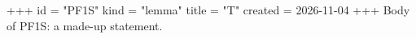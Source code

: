 +++
id = "PF1S"
kind = "lemma"
title = "T"
created = 2026-11-04
+++
Body of PF1S: a made-up statement.
